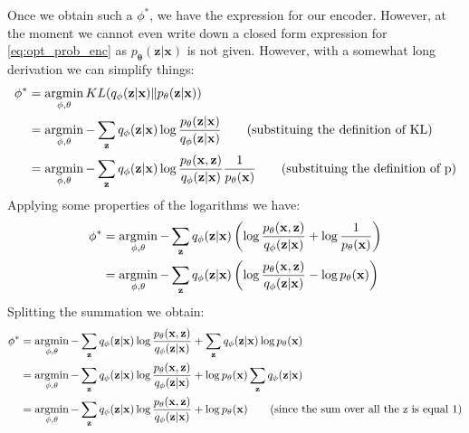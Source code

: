 Once we obtain such a $\phi^*$, we have the expression for our encoder. However, at the moment we cannot even write down a closed form expression for \cref{eq:opt_prob_enc} as $p_\mathbf{\theta}(\mathbf{z} | \mathbf{x})$ is not given. However, with a somewhat long derivation we can simplify things:
\begin{align}
	\mathbf{\phi}^* &= \operatorname*{\operatorname{argmin}}_{\mathbf{\phi}, \mathbf{\theta}} KL(q_{\mathbf{\phi}}(\mathbf{z} | \mathbf{x}) \| p_\mathbf{\theta}(\mathbf{z} | \mathbf{x})) \\
	&= \operatorname*{\operatorname{argmin}}_{\mathbf{\phi}, \mathbf{\theta}} - \sum_{\mathbf{z}}q_\mathbf{\phi}(\mathbf{z} | \mathbf{x})\log \frac{p_\mathbf{\theta}(\mathbf{z} | \mathbf{x})}{q_\mathbf{\phi}(\mathbf{z} | \mathbf{x})} \tag{substituing the definition of KL} \\
	&= \operatorname*{\operatorname{argmin}}_{\mathbf{\phi}, \mathbf{\theta}} - \sum_{\mathbf{z}}q_\mathbf{\phi}(\mathbf{z} | \mathbf{x})\log \frac{p_\mathbf{\theta}(\mathbf{x}, \mathbf{z})}{q_\mathbf{\phi}(\mathbf{z} | \mathbf{x})} \frac{1}{p_\mathbf{\theta}(\mathbf{x})} \tag{substituing the definition of p}
\end{align}
Applying some properties of the logarithms we have:
\begin{align}
	\mathbf{\phi}^* &= \operatorname*{\operatorname{argmin}}_{\mathbf{\phi}, \mathbf{\theta}} - \sum_{\mathbf{z}} q_\mathbf{\phi}(\mathbf{z} | \mathbf{x}) \left(\log \frac{p_\mathbf{\theta}(\mathbf{x}, \mathbf{z})}{q_\mathbf{\phi}(\mathbf{z} | \mathbf{x})} + \log \frac{1}{p_\mathbf{\theta}(\mathbf{x})} \right) \\
	&= \operatorname*{\operatorname{argmin}}_{\mathbf{\phi}, \mathbf{\theta}} - \sum_{\mathbf{z}} q_\mathbf{\phi}(\mathbf{z} | \mathbf{x}) \left(\log \frac{p_\mathbf{\theta}(\mathbf{x}, \mathbf{z})}{q_\mathbf{\phi}(\mathbf{z} | \mathbf{x})} - \log p_\mathbf{\theta}(\mathbf{x}) \right)
\end{align}
Splitting the summation we obtain:
\begin{align}
	\mathbf{\phi}^* &= \operatorname*{\operatorname{argmin}}_{\mathbf{\phi}, \mathbf{\theta}} - \sum_{\mathbf{z}} q_\mathbf{\phi}(\mathbf{z} | \mathbf{x}) \log \frac{p_\mathbf{\theta}(\mathbf{x}, \mathbf{z})}{q_\mathbf{\phi}(\mathbf{z} | \mathbf{x})} + \sum_{\mathbf{z}} q_\mathbf{\phi}(\mathbf{z} | \mathbf{x}) \log p_\mathbf{\theta}(\mathbf{x}) \\
	&= \operatorname*{\operatorname{argmin}}_{\mathbf{\phi}, \mathbf{\theta}} - \sum_{\mathbf{z}} q_\mathbf{\phi}(\mathbf{z} | \mathbf{x}) \log \frac{p_\mathbf{\theta}(\mathbf{x}, \mathbf{z})}{q_\mathbf{\phi}(\mathbf{z} | \mathbf{x})} + \log p_\mathbf{\theta}(\mathbf{x}) \sum_{\mathbf{z}} q_\mathbf{\phi}(\mathbf{z} | \mathbf{x}) \\
	&= \operatorname*{\operatorname{argmin}}_{\mathbf{\phi}, \mathbf{\theta}} - \sum_{\mathbf{z}} q_\mathbf{\phi}(\mathbf{z} | \mathbf{x}) \log \frac{p_\mathbf{\theta}(\mathbf{x}, \mathbf{z})}{q_\mathbf{\phi}(\mathbf{z} | \mathbf{x})} + \log p_\mathbf{\theta}(\mathbf{x}) \tag{since the sum over all the z is equal 1}
\end{align}
